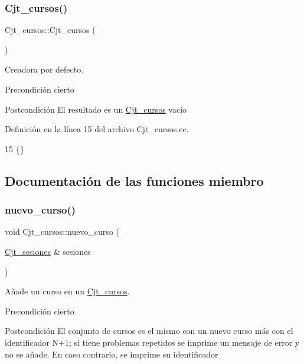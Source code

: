 \subsubsection{\texorpdfstring{Cjt\+\_\+cursos()}{Cjt\_cursos()}}
{\footnotesize\ttfamily Cjt\+\_\+cursos\+::\+Cjt\+\_\+cursos (\begin{DoxyParamCaption}{ }\end{DoxyParamCaption})}



Creadora por defecto. 

\begin{DoxyPrecond}{Precondición}
cierto 
\end{DoxyPrecond}
\begin{DoxyPostcond}{Postcondición}
El resultado es un \mbox{\hyperlink{class_cjt__cursos}{Cjt\+\_\+cursos}} vacío 
\end{DoxyPostcond}


Definición en la línea 15 del archivo Cjt\+\_\+cursos.\+cc.


\begin{DoxyCode}
15 \{\}
\end{DoxyCode}


\subsection{Documentación de las funciones miembro}
\mbox{\label{class_cjt__cursos_ae2e0a96f014dda94b0d8465838cf14b6}} 
\subsubsection{\texorpdfstring{nuevo\+\_\+curso()}{nuevo\_curso()}}
{\footnotesize\ttfamily void Cjt\+\_\+cursos\+::nuevo\+\_\+curso (\begin{DoxyParamCaption}\item[{\mbox{\hyperlink{class_cjt__sesiones}{Cjt\+\_\+sesiones}} \&}]{sesiones }\end{DoxyParamCaption})}



Añade un curso en un \mbox{\hyperlink{class_cjt__cursos}{Cjt\+\_\+cursos}}. 

\begin{DoxyPrecond}{Precondición}
cierto 
\end{DoxyPrecond}
\begin{DoxyPostcond}{Postcondición}
El conjunto de cursos es el mismo con un nuevo curso más con el identificador N+1; si tiene problemas repetidos se imprime un mensaje de error y no se añade. En caso contrario, se imprime su identificador 
\end{DoxyPostcond}


